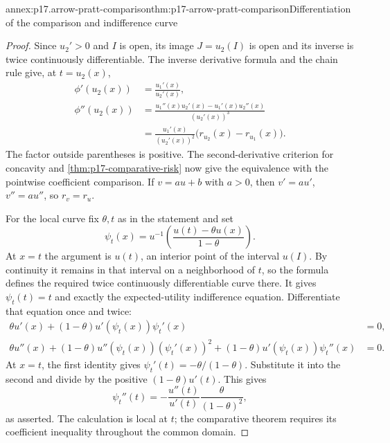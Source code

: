 \begin{annexitem}{annex:p17.arrow-pratt-comparison}{thm:p17-arrow-pratt-comparison}{Differentiation of the comparison and indifference curve}
\begin{proof}
Since \(u_2'>0\) and \(I\) is open, its image \(J=u_2(I)\)
is open and its inverse is twice continuously differentiable.
The inverse derivative formula and the chain rule give, at
\(t=u_2(x)\),
\[
\begin{aligned}
 \phi'(u_2(x))&=\frac{u_1'(x)}{u_2'(x)},\\
 \phi''(u_2(x))
   &=\frac{u_1''(x)u_2'(x)-u_1'(x)u_2''(x)}{(u_2'(x))^3}\\
   &=\frac{u_1'(x)}{(u_2'(x))^2}
                                  \bigl(r_{u_2}(x)-r_{u_1}(x)\bigr).
\end{aligned}
\]
The factor outside parentheses is positive. The second-derivative
criterion for concavity and \cref{thm:p17-comparative-risk} now give
the equivalence with the pointwise coefficient comparison. If
\(v=a u+b\) with \(a>0\), then \(v'=a u'\), \(v''=a u''\),
so \(r_v=r_u\).

For the local curve fix \(\theta,t\) as in the statement and set
\[
       \psi_t(x)=u^{-1}\left(\frac{u(t)-\theta u(x)}{1-\theta}\right).
\]
At \(x=t\) the argument is \(u(t)\), an interior point of the
interval \(u(I)\). By continuity it remains in that interval on a
neighborhood of \(t\), so the formula defines the required twice
continuously differentiable curve there. It gives \(\psi_t(t)=t\)
and exactly the expected-utility indifference equation.
Differentiate that equation once and twice:
\[
\begin{aligned}
 \theta u'(x)+(1-\theta)u'(\psi_t(x))\psi_t'(x)&=0,\\
 \theta u''(x)+(1-\theta)u''(\psi_t(x))(\psi_t'(x))^2
       +(1-\theta)u'(\psi_t(x))\psi_t''(x)&=0.
\end{aligned}
\]
At \(x=t\), the first identity gives
\(\psi_t'(t)=-\theta/(1-\theta)\). Substitute it into the second
and divide by the positive \((1-\theta)u'(t)\). This gives
\[
 \psi_t''(t)=-\frac{u''(t)}{u'(t)}
                \frac{\theta}{(1-\theta)^2},
\]
as asserted. The calculation is local at \(t\); the comparative
theorem requires its coefficient inequality throughout the common domain.
\end{proof}
\end{annexitem}


